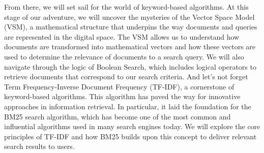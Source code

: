 \documentclass[10pt,twoside,slovak,a4paper]{article}
\begin{document}
From there, we will set sail for the world of keyword-based algorithms. At this stage of our adventure, we will uncover the mysteries of the Vector Space Model (VSM), a mathematical structure that underpins the way documents and queries are represented in the digital space. The VSM allows us to understand how documents are transformed into mathematical vectors and how these vectors are used to determine the relevance of documents to a search query. We will also navigate through the logic of Boolean Search, which includes logical operators to retrieve documents that correspond to our search criteria. And let's not forget Term Frequency-Inverse Document Frequency (TF-IDF), a cornerstone of keyword-based algorithms. This algorithm has paved the way for innovative approaches in information retrieval. In particular, it laid the foundation for the BM25 search algorithm, which has become one of the most common and influential algorithms used in many search engines today. We will explore the core principles of TF-IDF and how BM25 builds upon this concept to deliver relevant search results to users.


 
\cite{Chonyy}
\end{document}
